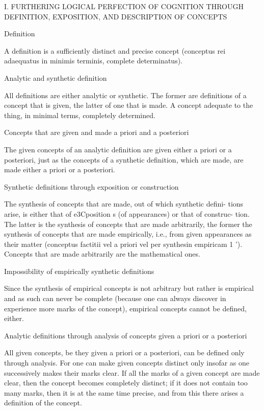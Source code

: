 
I. FURTHERING LOGICAL PERFECTION OF COGNITION THROUGH
DEFINITION, EXPOSITION, AND DESCRIPTION OF CONCEPTS

Definition

A definition is a sufficiently distinct and precise concept
(conceptus rei adaequatus in minimis terminis, complete determinatus).

Analytic and synthetic definition

All definitions are either analytic or synthetic.
The former are definitions of a concept that is given,
the latter of one that is made.
A concept adequate to the thing, in minimal terms, completely determined.

Concepts that are given and made a priori and a posteriori

The given concepts of an analytic definition
are given either a priori or a posteriori,
just as the concepts of a synthetic definition, which are made,
are made either a priori or a posteriori.

Synthetic definitions through exposition or construction

The synthesis of concepts that are made, out of which synthetic defini-
tions arise, is either that of e3Cposition s (of appearances) or that of construc-
tion. The latter is the synthesis of concepts that are made arbitrarily, the
former the synthesis of concepts that are made empirically, i.e., from given
appearances as their matter (conceptus factitii vel a priori vel per synthesin
empiricam 1 '). Concepts that are made arbitrarily are the mathematical ones.

Impossibility of empirically synthetic definitions

Since the synthesis of empirical concepts is not arbitrary but
rather is empirical and as such can never be complete
(because one can always discover in experience more marks of the concept),
empirical concepts cannot be defined, either.

Analytic definitions through analysis of
concepts given a priori or a posteriori

All given concepts, be they given a priori or a posteriori,
can be defined only through analysis.
For one can make given concepts distinct only insofar as
one successively makes their marks clear.
If all the marks of a given concept are made clear,
then the concept becomes completely distinct;
if it does not contain too many marks,
then it is at the same time precise,
and from this there arises a definition of the concept.

